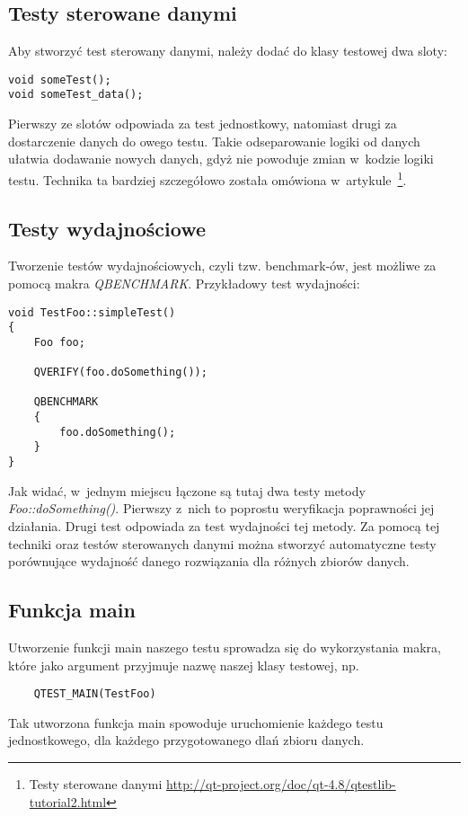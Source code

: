 \subsection{Testy sterowane danymi}
Aby stworzyć test sterowany danymi, należy dodać do klasy testowej dwa sloty:
\begin{lstlisting}
void someTest();
void someTest_data();
\end{lstlisting}
Pierwszy ze slotów odpowiada za test jednostkowy, natomiast drugi za dostarczenie danych do owego testu. Takie odseparowanie logiki od danych ułatwia dodawanie nowych danych, gdyż nie powoduje zmian w~kodzie logiki testu. Technika ta bardziej szczegółowo została omówiona w~artykule~\footnote{Testy sterowane danymi \url{http://qt-project.org/doc/qt-4.8/qtestlib-tutorial2.html}}.

\subsection{Testy wydajnościowe}
Tworzenie testów wydajnościowych, czyli tzw. benchmark-ów, jest możliwe za pomocą makra \textit{QBENCHMARK}. Przykładowy test wydajności:
\begin{lstlisting}[caption=Test wydajności, label=code:test]
void TestFoo::simpleTest()
{
	Foo foo;

	QVERIFY(foo.doSomething());

	QBENCHMARK 
	{
		foo.doSomething();
	}
}
\end{lstlisting}

Jak widać, w~jednym miejscu łączone są tutaj dwa testy metody \newline \textit{Foo::doSomething()}. Pierwszy z~nich to poprostu weryfikacja poprawności jej działania. Drugi test odpowiada za test wydajności tej metody. Za pomocą tej techniki oraz testów sterowanych danymi można stworzyć automatyczne testy porównujące wydajność danego rozwiązania dla różnych zbiorów danych.

\subsection{Funkcja main}
Utworzenie funkcji main naszego testu sprowadza się do wykorzystania makra, które jako argument przyjmuje nazwę naszej klasy testowej, np.
\begin{lstlisting}
	QTEST_MAIN(TestFoo)
\end{lstlisting}
Tak utworzona funkcja main spowoduje uruchomienie każdego testu jednostkowego, dla każdego przygotowanego dlań zbioru danych.

